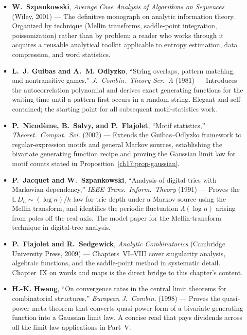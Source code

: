 \begin{itemize}
  \item \textbf{W.~Szpankowski}, \emph{Average Case Analysis of Algorithms on Sequences} (Wiley, 2001) \cite{Szpankowski2001} --- The definitive monograph on analytic information theory. Organized by technique (Mellin transforms, saddle-point integration, poissonization) rather than by problem; a reader who works through it acquires a reusable analytical toolkit applicable to entropy estimation, data compression, and word statistics.

  \item \textbf{L.~J. Guibas and A.~M. Odlyzko}, ``String overlaps, pattern matching, and nontransitive games,'' \emph{J.\ Combin.\ Theory Ser.~A} (1981) \cite{GuibasOdlyzko1981} --- Introduces the autocorrelation polynomial and derives exact generating functions for the waiting time until a pattern first occurs in a random string. Elegant and self-contained; the starting point for all subsequent motif-statistics work.

  \item \textbf{P.~Nicodème, B.~Salvy, and P.~Flajolet}, ``Motif statistics,'' \emph{Theoret.\ Comput.\ Sci.} (2002) \cite{NicodemeSalvyFlajolet2002} --- Extends the Guibas--Odlyzko framework to regular-expression motifs and general Markov sources, establishing the bivariate generating function recipe and proving the Gaussian limit law for motif counts stated in Proposition~\ref{ch17:prop-gaussian}.

  \item \textbf{P.~Jacquet and W.~Szpankowski}, ``Analysis of digital tries with Markovian dependency,'' \emph{IEEE Trans.\ Inform.\ Theory} (1991) \cite{JacquetSzpankowski1991} --- Proves the $\mathbb{E}\,D_n \sim (\log n)/h$ law for trie depth under a Markov source using the Mellin transform, and identifies the periodic fluctuation $\Lambda(\log n)$ arising from poles off the real axis. The model paper for the Mellin-transform technique in digital-tree analysis.

  \item \textbf{P.~Flajolet and R.~Sedgewick}, \emph{Analytic Combinatorics} (Cambridge University Press, 2009) \cite{FlajoletSedgewick2009} --- Chapters~VI--VIII cover singularity analysis, algebraic functions, and the saddle-point method in systematic detail. Chapter~IX on words and maps is the direct bridge to this chapter's content.

  \item \textbf{H.-K. Hwang}, ``On convergence rates in the central limit theorems for combinatorial structures,'' \emph{European J.\ Combin.} (1998) \cite{Hwang1998} --- Proves the quasi-power meta-theorem that converts quasi-power form of a bivariate generating function into a Gaussian limit law. A concise read that pays dividends across all the limit-law applications in Part~V.
\end{itemize}

